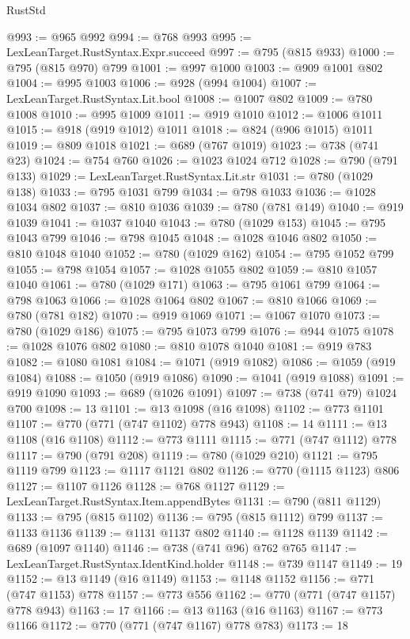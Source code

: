 \begin{lexlean}{RustStd}
\begin{coremodule}
{\begin{coremodule}
{{{{{{{{{{{{{{{@993 := @965 @992
@994 := @768 @993
@995 := LexLeanTarget.RustSyntax.Expr.succeed
@997 := @795 (@815 @933)
@1000 := @795 (@815 @970) @799
@1001 := @997 @1000
@1003 := @909 @1001 @802
@1004 := @995 @1003
@1006 := @928 (@994 @1004)
@1007 := LexLeanTarget.RustSyntax.Lit.bool
@1008 := @1007 @802
@1009 := @780 @1008
@1010 := @995 @1009
@1011 := @919 @1010
@1012 := @1006 @1011
@1015 := @918 (@919 @1012) @1011
@1018 := @824 (@906 @1015) @1011
@1019 := @809 @1018
@1021 := @689 (@767 @1019)
@1023 := @738 (@741 @23)
@1024 := @754 @760
@1026 := @1023 @1024 @712
@1028 := @790 (@791 @133)
@1029 := LexLeanTarget.RustSyntax.Lit.str
@1031 := @780 (@1029 @138)
@1033 := @795 @1031 @799
@1034 := @798 @1033
@1036 := @1028 @1034 @802
@1037 := @810 @1036
@1039 := @780 (@781 @149)
@1040 := @919 @1039
@1041 := @1037 @1040
@1043 := @780 (@1029 @153)
@1045 := @795 @1043 @799
@1046 := @798 @1045
@1048 := @1028 @1046 @802
@1050 := @810 @1048 @1040
@1052 := @780 (@1029 @162)
@1054 := @795 @1052 @799
@1055 := @798 @1054
@1057 := @1028 @1055 @802
@1059 := @810 @1057 @1040
@1061 := @780 (@1029 @171)
@1063 := @795 @1061 @799
@1064 := @798 @1063
@1066 := @1028 @1064 @802
@1067 := @810 @1066
@1069 := @780 (@781 @182)
@1070 := @919 @1069
@1071 := @1067 @1070
@1073 := @780 (@1029 @186)
@1075 := @795 @1073 @799
@1076 := @944 @1075
@1078 := @1028 @1076 @802
@1080 := @810 @1078 @1040
@1081 := @919 @783
@1082 := @1080 @1081
@1084 := @1071 (@919 @1082)
@1086 := @1059 (@919 @1084)
@1088 := @1050 (@919 @1086)
@1090 := @1041 (@919 @1088)
@1091 := @919 @1090
@1093 := @689 (@1026 @1091)
@1097 := @738 (@741 @79) @1024 @700
@1098 := 13
@1101 := @13 @1098 (@16 @1098)
@1102 := @773 @1101
@1107 := @770 (@771 (@747 @1102) @778 @943)
@1108 := 14
@1111 := @13 @1108 (@16 @1108)
@1112 := @773 @1111
@1115 := @771 (@747 @1112) @778
@1117 := @790 (@791 @208)
@1119 := @780 (@1029 @210)
@1121 := @795 @1119 @799
@1123 := @1117 @1121 @802
@1126 := @770 (@1115 @1123) @806
@1127 := @1107 @1126
@1128 := @768 @1127
@1129 := LexLeanTarget.RustSyntax.Item.appendBytes
@1131 := @790 (@811 @1129)
@1133 := @795 (@815 @1102)
@1136 := @795 (@815 @1112) @799
@1137 := @1133 @1136
@1139 := @1131 @1137 @802
@1140 := @1128 @1139
@1142 := @689 (@1097 @1140)
@1146 := @738 (@741 @96) @762 @765
@1147 := LexLeanTarget.RustSyntax.IdentKind.holder
@1148 := @739 @1147
@1149 := 19
@1152 := @13 @1149 (@16 @1149)
@1153 := @1148 @1152
@1156 := @771 (@747 @1153) @778
@1157 := @773 @556
@1162 := @770 (@771 (@747 @1157) @778 @943)
@1163 := 17
@1166 := @13 @1163 (@16 @1163)
@1167 := @773 @1166
@1172 := @770 (@771 (@747 @1167) @778 @783)
@1173 := 18
}}}}}}}}}}}}}}}
\end{coremodule}}
\end{coremodule}
\end{lexlean}
